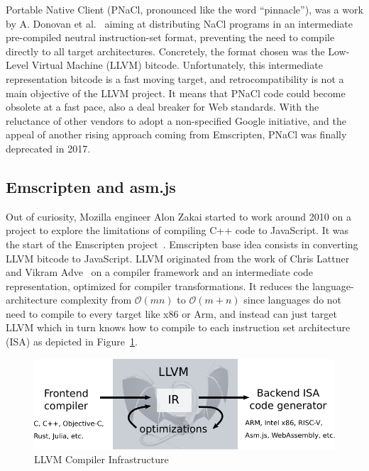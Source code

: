 Portable Native Client (PNaCl, pronounced like the word ``pinnacle''),
was a work by A. Donovan et al.~\cite{donovan2010pnacl} aiming at distributing
NaCl programs in an intermediate pre-compiled neutral instruction-set format,
preventing the need to compile directly to all target architectures.
Concretely, the format chosen was the Low-Level Virtual Machine (LLVM) bitcode.
Unfortunately, this intermediate representation bitcode is a fast moving target,
and retrocompatibility is not a main objective of the LLVM project.
It means that PNaCl code could become obsolete at a fast pace,
also a deal breaker for Web standards.
With the reluctance of other vendors to adopt a non-specified Google initiative,
and the appeal of another rising approach coming from Emscripten,
PNaCl was finally deprecated in 2017.

\subsection{Emscripten and asm.js}%
\label{sub:emscripten-asmjs}

Out of curiosity, Mozilla engineer Alon Zakai started to work around 2010
on a project to explore the limitations of compiling C++ code to JavaScript.
It was the start of the Emscripten project~\cite{zakai2011emscripten}.
Emscripten base idea consists in converting LLVM bitcode to JavaScript.
LLVM originated from the work of
Chris Lattner and Vikram Adve~\cite{lattner2004llvm} on a compiler framework
and an intermediate code representation, optimized for compiler transformations.
It reduces the language-architecture complexity from $\mathcal{O}(mn)$ to $\mathcal{O}(m+n)$
since languages do not need to compile to every target like x86 or Arm,
and instead can just target LLVM which in turn knows how to compile to each
instruction set architecture (ISA) as depicted in Figure~\ref{fig:llvm}.

\begin{figure}[h]
	\centering
	\includegraphics[width=\linewidth]{assets/img/llvm.pdf}
	\caption{LLVM Compiler Infrastructure}%
	\label{fig:llvm}
\end{figure}

